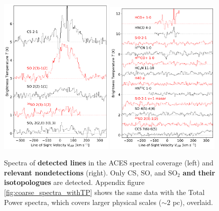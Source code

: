 \documentclass[]{aastex631}
\def\rr#1{\textbf{#1}}
\begin{document}
\begin{figure}[!ht]
    \centering
    \includegraphics[width=0.49\textwidth]{figures/CSandSO_Overlays.pdf}
    \includegraphics[width=0.49\textwidth]{figures/NonDetection_Overlays.pdf}
    \caption{Spectra of \rr{detected lines} in the ACES spectral coverage (left) and \rr{relevant nondetections} (right).
    Only CS, SO, and SO$_2$ \rr{and their isotopologues} are detected.
    Appendix figure \ref{fig:coarse_spectra_withTP} shows the same data with the Total Power spectra, which covers larger physical scales ($\sim2$ pc), overlaid.
    }
    \label{fig:coarse_spectra}
\end{figure}
\end{document}
